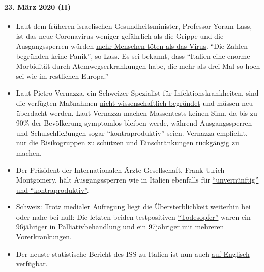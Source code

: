 \hypertarget{23-muxe4rz-2020-ii}{%
\paragraph{23. März 2020 (II)}\label{23-muxe4rz-2020-ii}}

\begin{itemize}
\tightlist
\item
  Laut dem früheren israelischen Gesundheitsminister, Professor Yoram
  Lass, ist das neue Coronavirus weniger gefährlich als die Grippe und
  die Ausgangssperren würden
  \href{https://en.globes.co.il/en/article-lockdown-lunacy-1001322696}{mehr
  Menschen töten als das Virus}. ``Die Zahlen begründen keine Panik'',
  so Lass. Es sei bekannt, dass ``Italien eine enorme Morbidität durch
  Atemwegserkrankungen habe, die mehr als drei Mal so hoch sei wie im
  restlichen Europa.''
\item
  Laut Pietro Vernazza, ein Schweizer Spezialist für
  Infektionskrankheiten, sind die verfügten Maßnahmen
  \href{https://www.tagblatt.ch/leben/ostschweizer-infektiologe-pietro-vernazza-die-zahlen-zu-den-jungen-corona-virus-erkrankten-sind-irrefuehrend-ld.1206440}{nicht
  wissenschaftlich begründet} und müssen neu überdacht werden. Laut
  Vernazza machen Massentests keinen Sinn, da bis zu 90\% der
  Bevölkerung symptomlos bleiben werde, während Ausgangssperren und
  Schulschließungen sogar ``kontraproduktiv'' seien. Vernazza empfiehlt,
  nur die Risikogruppen zu schützen und Einschränkungen rückgängig zu
  machen.
\item
  Der Präsident der Internationalen Ärzte-Gesellschaft, Frank Ulrich
  Montgomery, hält Ausgangssperren wie in Italien ebenfalls für
  \href{https://www.general-anzeiger-bonn.de/news/politik/deutschland/interview-mit-weltaerztepraesident-montgomery-ueber-corona-pandemie-ist-chaos_aid-49609561}{``unvernünftig''
  und ``kontraproduktiv''}.
\item
  Schweiz: Trotz medialer Aufregung liegt die Übersterblichkeit
  weiterhin bei oder nahe bei null: Die letzten beiden testpositiven
  \href{https://www.bluewin.ch/de/newsregional/zuerich/1068-bestatigte-corona-falle-und-funf-todesfalle-im-kanton-zurich-371873.html}{``Todesopfer''}
  waren ein 96jähriger in Palliativ­behandlung und ein 97jähriger mit
  mehreren Vorerkrankungen.
\item
  Der neuste statistische Bericht des ISS zu Italien ist nun auch
  \href{https://www.epicentro.iss.it/coronavirus/bollettino/Report-COVID-2019_20_marzo_eng.pdf}{auf
  Englisch verfügbar}.
\end{itemize}

